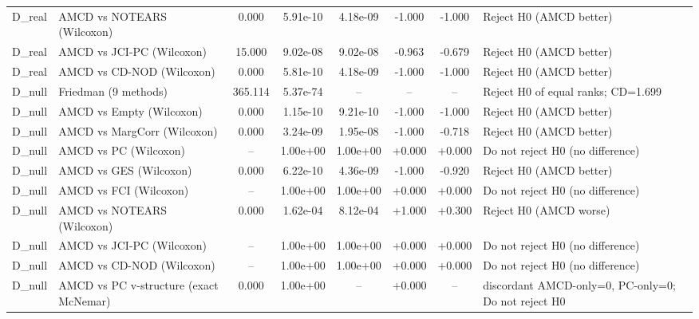 \begin{tabular}{llcccccp{4.2cm}}
D\_real & AMCD vs NOTEARS (Wilcoxon) & 0.000 & 5.91e-10 & 4.18e-09 & -1.000 & -1.000 & Reject H0 (AMCD better) \\
D\_real & AMCD vs JCI-PC (Wilcoxon) & 15.000 & 9.02e-08 & 9.02e-08 & -0.963 & -0.679 & Reject H0 (AMCD better) \\
D\_real & AMCD vs CD-NOD (Wilcoxon) & 0.000 & 5.81e-10 & 4.18e-09 & -1.000 & -1.000 & Reject H0 (AMCD better) \\
D\_null & Friedman (9 methods) & 365.114 & 5.37e-74 & -- & -- & -- & Reject H0 of equal ranks; CD=1.699 \\
D\_null & AMCD vs Empty (Wilcoxon) & 0.000 & 1.15e-10 & 9.21e-10 & -1.000 & -1.000 & Reject H0 (AMCD better) \\
D\_null & AMCD vs MargCorr (Wilcoxon) & 0.000 & 3.24e-09 & 1.95e-08 & -1.000 & -0.718 & Reject H0 (AMCD better) \\
D\_null & AMCD vs PC (Wilcoxon) & -- & 1.00e+00 & 1.00e+00 & +0.000 & +0.000 & Do not reject H0 (no difference) \\
D\_null & AMCD vs GES (Wilcoxon) & 0.000 & 6.22e-10 & 4.36e-09 & -1.000 & -0.920 & Reject H0 (AMCD better) \\
D\_null & AMCD vs FCI (Wilcoxon) & -- & 1.00e+00 & 1.00e+00 & +0.000 & +0.000 & Do not reject H0 (no difference) \\
D\_null & AMCD vs NOTEARS (Wilcoxon) & 0.000 & 1.62e-04 & 8.12e-04 & +1.000 & +0.300 & Reject H0 (AMCD worse) \\
D\_null & AMCD vs JCI-PC (Wilcoxon) & -- & 1.00e+00 & 1.00e+00 & +0.000 & +0.000 & Do not reject H0 (no difference) \\
D\_null & AMCD vs CD-NOD (Wilcoxon) & -- & 1.00e+00 & 1.00e+00 & +0.000 & +0.000 & Do not reject H0 (no difference) \\
D\_null & AMCD vs PC v-structure (exact McNemar) & 0.000 & 1.00e+00 & -- & +0.000 & -- & discordant AMCD-only=0, PC-only=0; Do not reject H0 \\
\bottomrule
\end{tabular}
